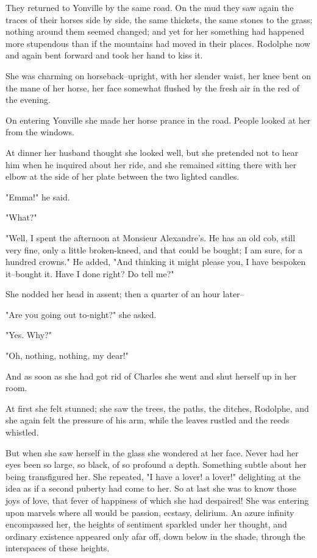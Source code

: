 \documentclass[11pt,twocolumn]{ltugboat}
\begin{document}
They returned to Yonville by the same road. On the mud they saw again
the traces of their horses side by side, the same thickets, the same
stones to the grass; nothing around them seemed changed; and yet for her
something had happened more stupendous than if the mountains had moved
in their places. Rodolphe now and again bent forward and took her hand
to kiss it.

She was charming on horseback--upright, with her slender waist, her knee
bent on the mane of her horse, her face somewhat flushed by the fresh
air in the red of the evening.

On entering Yonville she made her horse prance in the road. People
looked at her from the windows.

At dinner her husband thought she looked well, but she pretended not to
hear him when he inquired about her ride, and she remained sitting there
with her elbow at the side of her plate between the two lighted candles.

"Emma!" he said.

"What?"

"Well, I spent the afternoon at Monsieur Alexandre's. He has an old cob,
still very fine, only a little broken-kneed, and that could be bought; I
am sure, for a hundred crowns." He added, "And thinking it might please
you, I have bespoken it--bought it. Have I done right? Do tell me?"

She nodded her head in assent; then a quarter of an hour later--

"Are you going out to-night?" she asked.

"Yes. Why?"

"Oh, nothing, nothing, my dear!"

And as soon as she had got rid of Charles she went and shut herself up
in her room.

At first she felt stunned; she saw the trees, the paths, the ditches,
Rodolphe, and she again felt the pressure of his arm, while the leaves
rustled and the reeds whistled.

But when she saw herself in the glass she wondered at her face. Never
had her eyes been so large, so black, of so profound a depth. Something
subtle about her being transfigured her. She repeated, "I have a lover!
a lover!" delighting at the idea as if a second puberty had come to her.
So at last she was to know those joys of love, that fever of happiness
of which she had despaired! She was entering upon marvels where all
would be passion, ecstasy, delirium. An azure infinity encompassed
her, the heights of sentiment sparkled under her thought, and ordinary
existence appeared only afar off, down below in the shade, through the
interspaces of these heights.
\end{document}
